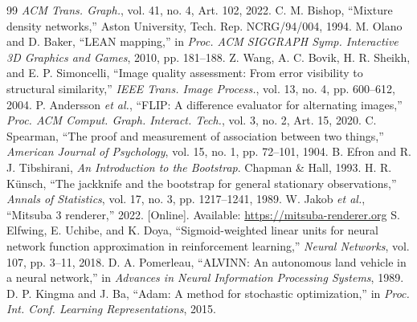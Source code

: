 \documentclass[conference]{IEEEtran}
\begin{document}
\begin{thebibliography}{99}
\emph{ACM Trans. Graph.}, vol. 41, no. 4, Art. 102, 2022.
 C. M. Bishop, ``Mixture density networks,'' Aston University,
Tech. Rep. NCRG/94/004, 1994.
 M. Olano and D. Baker, ``LEAN mapping,'' in \emph{Proc. ACM
SIGGRAPH Symp. Interactive 3D Graphics and Games}, 2010, pp. 181--188.
 Z. Wang, A. C. Bovik, H. R. Sheikh, and E. P. Simoncelli,
``Image quality assessment: From error visibility to structural similarity,''
\emph{IEEE Trans. Image Process.}, vol. 13, no. 4, pp. 600--612, 2004.
 P. Andersson \emph{et al.}, ``FLIP: A difference evaluator
for alternating images,'' \emph{Proc. ACM Comput. Graph. Interact. Tech.},
vol. 3, no. 2, Art. 15, 2020.
 C. Spearman, ``The proof and measurement of association
between two things,'' \emph{American Journal of Psychology}, vol. 15, no. 1,
pp. 72--101, 1904.
 B. Efron and R. J. Tibshirani, \emph{An Introduction to the
Bootstrap}. Chapman \& Hall, 1993.
 H. R. K\"unsch, ``The jackknife and the bootstrap for general
stationary observations,'' \emph{Annals of Statistics}, vol. 17, no. 3,
pp. 1217--1241, 1989.
 W. Jakob \emph{et al.}, ``Mitsuba 3 renderer,'' 2022.
[Online]. Available: \url{https://mitsuba-renderer.org}
 S. Elfwing, E. Uchibe, and K. Doya, ``Sigmoid-weighted
linear units for neural network function approximation in reinforcement
learning,'' \emph{Neural Networks}, vol. 107, pp. 3--11, 2018.
 D. A. Pomerleau, ``ALVINN: An autonomous land vehicle in
a neural network,'' in \emph{Advances in Neural Information Processing
Systems}, 1989.
 D. P. Kingma and J. Ba, ``Adam: A method for stochastic
optimization,'' in \emph{Proc. Int. Conf. Learning Representations}, 2015.
\end{thebibliography}
\end{document}
